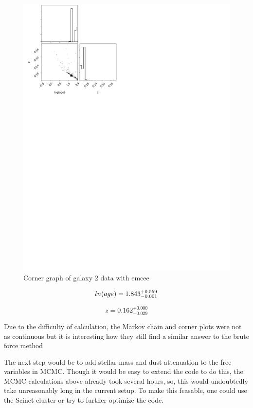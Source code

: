 \documentclass{article}
\begin{document}
\begin{figure}[H]
  \centering
\includegraphics[scale=0.5]{Corner Graph Galaxy 2}
\caption{Corner graph of galaxy 2 data with emcee}
\end{figure}

$$ln{\textrm(age)} = 1.843^{+0.559}_{-0.001}$$

$$z = 0.162^{+0.000}_{-0.029}$$

Due to the difficulty of calculation, the Markov chain and corner plots were not as continuous but it is
interesting how they still find a similar answer to the brute force method

The next step would be to add stellar mass and dust attenuation to the free variables in MCMC.
Though it would be easy to extend the code to do this, the MCMC calculations above already
took several hours, so, this would undoubtedly take unreasonably long in the current setup. To make
this feasable, one could use the Scinet cluster or try to further optimize the code.
\end{document}
